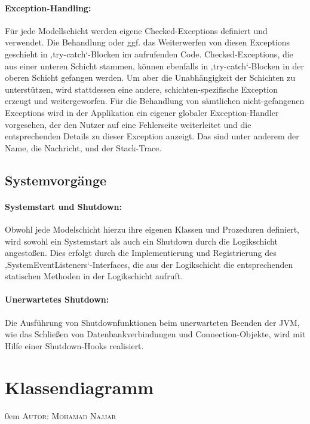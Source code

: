 \documentclass{article}
\makeatletter
\newcommand{\sectionauthor}[1]{
	{\parindent 0em \large \scshape Autor: #1 \par \nobreak \vspace*{1em}}
	\@afterheading
}
\makeatother
\begin{document}
\paragraph{Exception-Handling:} 
Für jede Modellschicht werden eigene Checked-Exceptions definiert und verwendet. Die Behandlung oder ggf. das Weiterwerfen von diesen Exceptions geschieht in ‚try-catch‘-Blocken im aufrufenden Code. 
Checked-Exceptions, die aus einer unteren Schicht stammen, können ebenfalls in ‚try-catch‘-Blocken in der oberen Schicht gefangen werden. 
Um aber die Unabhängigkeit der Schichten zu unterstützen, wird stattdessen eine andere, schichten-spezifische Exception erzeugt und weitergeworfen. 
Für die Behandlung von sämtlichen nicht-gefangenen Exceptions wird in der Applikation ein eigener globaler Exception-Handler vorgesehen, der den Nutzer auf eine Fehlerseite weiterleitet und die entsprechenden Details zu dieser Exception anzeigt. 
Das sind unter anderem der Name, die Nachricht, und der Stack-Trace. 



\subsection{Systemvorgänge}

\paragraph{Systemstart und Shutdown:}
Obwohl jede Modelschicht hierzu ihre eigenen Klassen und Prozeduren definiert, wird sowohl ein Systemstart als auch ein Shutdown durch die Logikschicht angestoßen. 
Dies erfolgt durch die Implementierung und Registrierung des ‚SystemEventListeners‘-Interfaces, die aus der Logikschicht die entsprechenden statischen Methoden in der Logikschicht aufruft.

\paragraph{Unerwartetes Shutdown:}
Die Ausführung von Shutdownfunktionen beim unerwarteten Beenden der JVM, wie das Schließen von Datenbankverbindungen und Connection-Objekte, wird mit Hilfe einer Shutdown-Hooks realisiert. 




\section{Klassendiagramm}
\sectionauthor{Mohamad Najjar}
\end{document}
